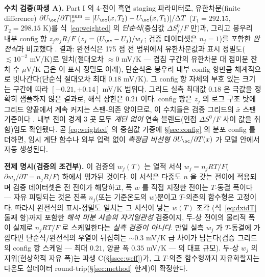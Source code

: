 \begin{srcbox}
\textbf{수치 검증(파생 A).} Part I 의 4-전이 흑연 staging 파라미터로, 유한차분(finite difference)
$\partial U_\oc/\partial T|_x^\mathrm{num}=[U_\oc(x,T_2)-U_\oc(x,T_1)]/\Delta T$ ($T_1{=}292.15$, $T_2{=}298.15$ K)를
식~\eqref{eq:weighted} 의 \emph{단순식}(중심값 $\Delta S^0_j/F$ 만)과, 그리고 봉우리 내부 config 항 $z_j n_jR/F$
($z_j=(U_\oc-U_j)/w_j$; 검증 데이터셋은 $n_j{=}1$)를 포함한 \emph{완전식}과 비교했다 \cite{numverif2026}.
결과: 완전식은 175 점 전 범위에서 유한차분값과 표시 정밀도($\lesssim10^{-2}$ mV/K)로 일치(절대오차 $\approx0$
mV/K --- 겹침 구간의 유한차분 대 점미분 잔차 수 $\mu$V/K 급은 이 표시 정밀도 아래), 단순식은 봉우리 내부
config 항만큼 체계적으로 빗나간다(단순식 절대오차 최대 $0.18$ mV/K). 그 config 항 자체의 부호 있는 크기는
구간에 따라 $[-0.21,+0.14]$ mV/K 범위다. 그리드 실측 최대값 $0.18$ 은 극값을 정확히 샘플하지 않은 결과로,
해석 상한은 $0.21$ 이다. config 항은 $z_j$ 의 로그 구조 탓에 그리드 양끝에서 계속 커지는 스팬-의존 양이므로,
이 수치들은 검증 그리드의 $\bar x$ 스팬 기준이다 \cite{numverif2026}. 내부 전이 경계 3 곳 모두 \emph{계단 없이}
연속 블렌드(인접 $\Delta S^0/F$ 사이 값을 취함)임도 확인됐다. 곧 \eqref{eq:weighted} 의 중심값 가중에
\S\ref{sec:config} 의 분포 config 를 더하면, 임시 계단 함수나 외부 입력 없이 \emph{측정급 비선형}
$\partial U_\oc/\partial T(x)$ 가 모델 안에서 자동 생성된다.

\textbf{전제 명시(검증의 조건부).} 이 검증의 $w_j(T)$ 는 열적 서식 $w_j=n_jRT/F$($\partial
w_j/\partial T=n_jR/F$) 하에서 평가된 것이다. 이 서식은 다중도 $n$ 을 갖는 전이에 적용되며 검증 데이터셋은 전
전이가 해당하고, 폭 $w$ 를 직접 지정한 전이는 $T$-동결 폭이다 --- 자유 피팅되는 것은 진폭 $n_j$(또는 기준온도의
$w$)뿐이고 $T$-의존의 함수형은 고정이다. 따라서 완전식의 표시-정밀도 일치는 그 서식이 낳는 $w(T)$ 조각
(식~\eqref{eq:dxidT} 둘째 항)까지 포함한 \emph{해석 미분 사슬의 자기일관성} 검증이지, 두-상 전이의 물리적 폭이
실제로 $n_jRT/F$ 로 스케일한다는 \emph{실측 검증이 아니다}. 만일 실측 $w_j$ 가 $T$-동결에 가깝다면 단순식/완전식의
우열이 뒤집히는 $\sim$0.3 mV/K 급 차이가 남는다(검증 그리드의 config 항 스케일 --- 최대 $0.21$, 양끝 폭 $0.35$
mV/K --- 의 대표 규모). 두-상 $w_j$ 의 지위(현상학적 자유 폭)는 파생 C(\S\ref{ssec:weff})가, 그 $T$-의존
함수형까지 자유화할지는 다온도 실데이터 round-trip(\S\ref{sec:method} 한계)이 확정한다.
\end{srcbox}


